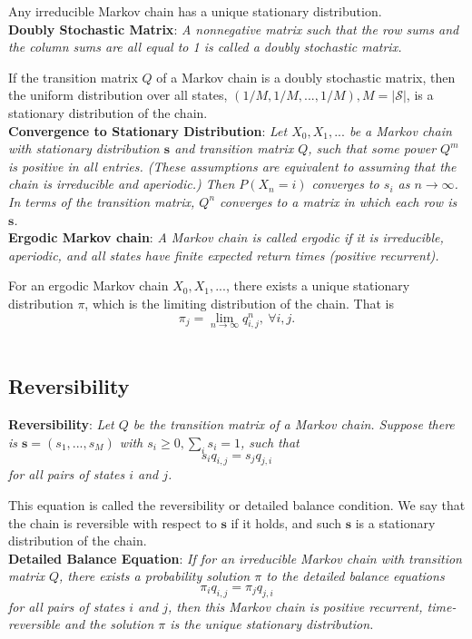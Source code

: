 \documentclass{progartcn}
\begin{document}
			Any irreducible Markov chain has a unique stationary distribution.\\

			\textbf{Doubly Stochastic Matrix}: \textit{A nonnegative matrix such that the row sums and the column sums are all equal to 1 is called a doubly stochastic matrix.}

			If the transition matrix $Q$ of a Markov chain is a doubly stochastic matrix, then the uniform distribution over all states, $(1/M,1/M,...,1/M), M=|\mathcal{S}|$, is a stationary distribution of the chain.\\

			\textbf{Convergence to Stationary Distribution}: \textit{Let $X_0, X_1, ...$ be a Markov chain with stationary distribution $\mathbf{s}$ and transition matrix $Q$, such that some power $Q^m$ is positive in all entries. (These assumptions are equivalent to assuming that the chain is irreducible and aperiodic.) Then $P(X_n = i)$ converges to $s_i$ as $n\to \infty$. In terms of the transition matrix, $Q^n$ converges to a matrix in which each row is $\mathbf{s}$.}\\

			\textbf{Ergodic Markov chain}: \textit{A Markov chain is called ergodic if it is irreducible, aperiodic, and all states have finite expected return times (positive recurrent).}

			For an ergodic Markov chain $X_0,X_1,...$, there exists a unique stationary distribution $\pi$, which is the limiting distribution of the chain. That is
			\[\pi_j=\lim_{n\to\infty} q_{i,j}^n,\ \forall i,j.\]\
		
	\subsection{Reversibility}

			\textbf{Reversibility}: \textit{Let $Q$ be the transition matrix of a Markov chain. Suppose there is $\mathbf{s} = (s_1,...,s_M)$ with $s_i\ge0,\sum_i s_i=1$, such that}
			\[s_iq_{i,j}=s_jq_{j,i}\]
			\textit{for all pairs of states $i$ and $j$.}

			This equation is called the reversibility or detailed balance condition. We say that the chain is reversible with respect to $\mathbf{s}$ if it holds, and such $\mathbf{s}$ is a stationary distribution of the chain.\\

			\textbf{Detailed Balance Equation}: \textit{If for an irreducible Markov chain with transition matrix $Q$, there exists a probability solution $\pi$ to the detailed balance equations}
			\[\pi_i q_{i,j}=\pi_j q_{j,i}\]
			\textit{for all pairs of states $i$ and $j$, then this Markov chain is positive recurrent, time-reversible and the solution $\pi$ is the unique stationary distribution.}\\
\end{document}
